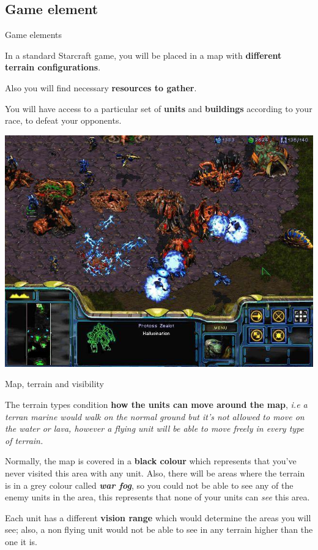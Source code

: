 \documentclass[10pt]{beamer}
\begin{document}
\subsection{Game element}
\begin{frame}{Game elements}

In a standard Starcraft game, you will be placed in a map with \textbf{different terrain configurations}.\newline

Also you will find necessary \textbf{resources to gather}.\newline

You will have access to a particular set of \textbf{units} and \textbf{buildings} according to your race, to defeat your opponents.

\begin{center}
	  \includegraphics[scale=0.3]{gam1.jpg}
\end{center}
\end{frame}



\begin{frame}{Map, terrain and visibility}

The terrain types condition \textbf{how the units can move around the map}, \small{\textit{i.e a terran marine would walk on the normal ground but it's not allowed to move on the water or lava, however a flying unit will be able to move freely in every type of terrain.}} \newline

Normally, the map is covered in a \textbf{black colour} which represents that you've never visited this area with any unit. Also, there will be areas where the terrain is in a grey colour called \textbf{\textit{war fog}}, so you could not be able to see any of the enemy units in the area, this represents that none of your units can \textit{see} this area.\newline

Each unit has a different \textbf{vision range} which would determine the areas you will see; also, a non flying unit would not be able to see in any terrain higher than the one it is.
\end{frame}
\end{document}
